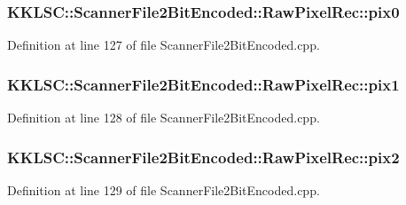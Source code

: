 \subsubsection[{\texorpdfstring{pix0}{pix0}}]{ K\+K\+L\+S\+C\+::\+Scanner\+File2\+Bit\+Encoded\+::\+Raw\+Pixel\+Rec\+::pix0}\hypertarget{struct_scanner_file2_bit_encoded_1_1_raw_pixel_rec_a7aa3d1294795e174e035d2962ccc01fe}{}\label{struct_scanner_file2_bit_encoded_1_1_raw_pixel_rec_a7aa3d1294795e174e035d2962ccc01fe}


Definition at line 127 of file Scanner\+File2\+Bit\+Encoded.\+cpp.

\subsubsection[{\texorpdfstring{pix1}{pix1}}]{ K\+K\+L\+S\+C\+::\+Scanner\+File2\+Bit\+Encoded\+::\+Raw\+Pixel\+Rec\+::pix1}\hypertarget{struct_scanner_file2_bit_encoded_1_1_raw_pixel_rec_a6e2c3b2592e06b670f71e6f774286a4a}{}\label{struct_scanner_file2_bit_encoded_1_1_raw_pixel_rec_a6e2c3b2592e06b670f71e6f774286a4a}


Definition at line 128 of file Scanner\+File2\+Bit\+Encoded.\+cpp.

\subsubsection[{\texorpdfstring{pix2}{pix2}}]{ K\+K\+L\+S\+C\+::\+Scanner\+File2\+Bit\+Encoded\+::\+Raw\+Pixel\+Rec\+::pix2}\hypertarget{struct_scanner_file2_bit_encoded_1_1_raw_pixel_rec_adbf569ee8c4c1449336ec669b7dd7c6c}{}\label{struct_scanner_file2_bit_encoded_1_1_raw_pixel_rec_adbf569ee8c4c1449336ec669b7dd7c6c}


Definition at line 129 of file Scanner\+File2\+Bit\+Encoded.\+cpp.

